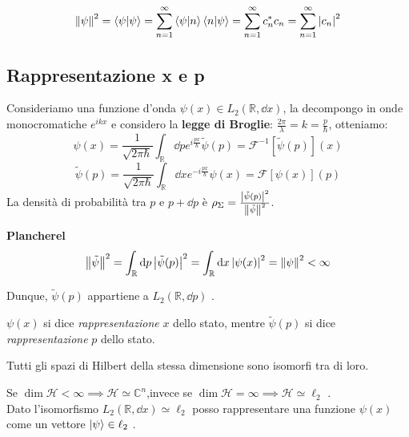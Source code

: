 \begin{example}
    \[
    \norm{\psi}^2= \braket{\psi}= \sum_{n=1}^{\infty} \braket{\psi}{n}\braket{n}{\psi}=
    \sum_{n=1}^{\infty}c^*_n c_n    = \sum_{n=1}^{\infty} \abs{c_n}^2   
    \]
\end{example}


\subsection{Rappresentazione x e p}
Consideriamo una funzione d'onda \(\psi(x) \in L_2(\mathbb{R}, \dd{x})\),
la decompongo in onde monocromatiche \(e^{ikx}\) e considero la \textbf{legge di Broglie}: \(\frac{2\pi}{\lambda}= k = \frac{p}{\hbar}\), otteniamo:
\[
\psi(x)= \frac{1}{\sqrt{2\pi\hbar}}\int_{\mathbb{R}} \dd{p} e^{i\frac{px}{\hbar}} \tilde{\psi}(p) = \mathcal{F}^{-1}[\tilde{\psi}(p)](x)
\]
\[
\tilde{\psi}(p)= \frac{1}{\sqrt{2\pi\hbar}}\int_{\mathbb{R}} \dd{x} e^{-i\frac{px}{\hbar}} \psi(x)= \mathcal{F}[\psi(x)](p)
\]
La densità di probabilità tra \(p\) e \(p +\dd{p}\) è \(\rho_\Sigma= \frac{\abs{\tilde{\psi}(p)}^2}{\norm{\tilde{\psi}}^2}\).
\begin{theorem}
    \textbf{Plancherel}
    \[
    \norm{\tilde{\psi}}^2= \int_{\mathbb{R}} \dd{p} \abs{\tilde{\psi}(p)}^2= \int_{\mathbb{R}} \dd{x} \abs{\psi(x)}^2 = \norm{\psi}^2 <\infty
    \]
\end{theorem}
Dunque, \(\tilde{\psi}(p)\) appartiene a \(L_2(\mathbb{R},\dd{p})\) .

\begin{definition}
    \(\psi(x)\) si dice \textit{rappresentazione} \(x\) dello stato, mentre
    \(\tilde{\psi}(p)\) si dice \textit{rappresentazione} \(p\) dello stato.
\end{definition}

\begin{theorem}
    Tutti gli spazi di Hilbert della stessa dimensione sono isomorfi tra di loro.
\end{theorem}

\begin{example}
    Se \(\operatorname{dim} \mathcal{H} < \infty \implies \mathcal{H}\simeq \mathbb{C}^n\),invece
    se \(\operatorname{dim} \mathcal{H} = \infty \implies \mathcal{H} \simeq \ell_2\) .\\
    Dato l'isomorfismo \(L_2(\mathbb{R},\dd{x})\simeq \ell_2\) posso rappresentare una funzione \(\psi(x)\) come un vettore \(\ket{\psi}\in \ell_2\) .
\end{example}

